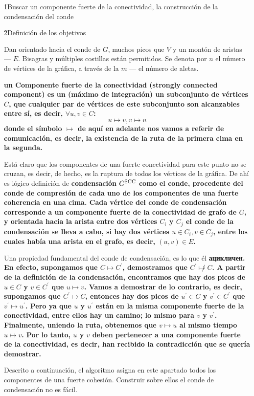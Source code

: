\h1{Buscar un componente fuerte de la conectividad, la construcción de la condensación del conde}

\h2{Definición de los objetivos}

Dan orientado hacia el conde de $G$, muchos picos que $V$ y un montón de aristas --- $E$. Bisagras y múltiples costillas están permitidos. Se denota por $n$ el número de vértices de la gráfica, a través de la $m$ --- el número de aletas.

\bf{un Componente fuerte de la conectividad} (strongly connected component) es un (máximo de integración) un subconjunto de vértices $C$, que cualquier par de vértices de este subconjunto son alcanzables entre sí, es decir, $\forall u,v \in C$:
$$ u \mapsto v, v \mapsto u $$
donde el símbolo $\mapsto$ de aquí en adelante nos vamos a referir de comunicación, es decir, la existencia de la ruta de la primera cima en la segunda.

Está claro que los componentes de una fuerte conectividad para este punto no se cruzan, es decir, de hecho, es la ruptura de todos los vértices de la gráfica. De ahí es lógico definición de \bf{condensación} $G^{\rm SCC}$ como el conde, procedente del conde de compresión de cada uno de los componentes de una fuerte coherencia en una cima. Cada vértice del conde de condensación corresponde a un componente fuerte de la conectividad de grafo de $G$, y orientada hacia la arista entre dos vértices $C_i$ y $C_j$ el conde de la condensación se lleva a cabo, si hay dos vértices $u \in C_i, v \in C_j$, entre los cuales había una arista en el grafo, es decir, $(u,v) \in E$.

Una propiedad fundamental del conde de condensación, es lo que él \bf{ацикличен}. En efecto, supongamos que $C \mapsto C^\prime$, demostramos que $C^\prime \not\mapsto C$. A partir de la definición de la condensación, encontramos que hay dos picos de $u \in C$ y $v \in C^\prime$ que $u \mapsto v$. Vamos a demostrar de lo contrario, es decir, supongamos que $C^\prime \mapsto C$, entonces hay dos picos de $u^\prime \in C$ y $v^\prime \in C^\prime$ que $v^\prime \mapsto u^\prime$. Pero ya que $u$ y $u^\prime$ están en la misma componente fuerte de la conectividad, entre ellos hay un camino; lo mismo para $v$ y $v^\prime$. Finalmente, uniendo la ruta, obtenemos que $v \mapsto u$ al mismo tiempo $u \mapsto v$. Por lo tanto, $u$ y $v$ deben pertenecer a una componente fuerte de la conectividad, es decir, han recibido la contradicción que se quería demostrar.

Descrito a continuación, el algoritmo asigna en este apartado todos los componentes de una fuerte cohesión. Construir sobre ellos el conde de condensación no es fácil.

